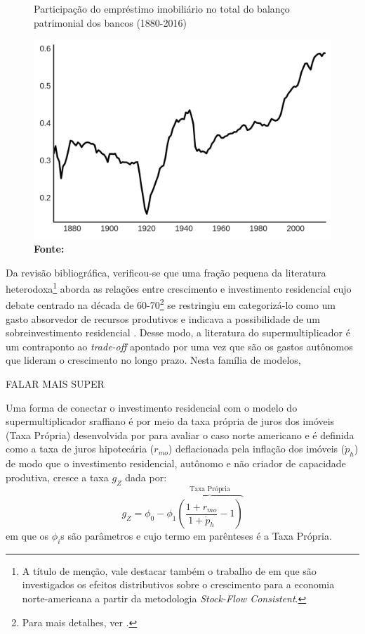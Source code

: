 \begin{figure}
	\centering
	\caption{Participação do empréstimo imobiliário no total do balanço patrimonial dos bancos (1880-2016)}
	\includegraphics{Jorda_Mean.png}
	\caption*{\textbf{Fonte:}}
\end{figure}

Da revisão bibliográfica, verificou-se que uma fração pequena da literatura heterodoxa\footnote{
	A título de menção, vale destacar também o trabalho de \textcite{zezza_u.s._2008} em que são investigados os efeitos distributivos sobre o crescimento para a economia norte-americana a partir da metodologia \textit{Stock-Flow Consistent}.}
aborda as relações entre crescimento e investimento residencial cujo debate centrado na década de 60-70\footnote{Para mais detalhes, ver \textcite{arku_housing_2006}.} se restringiu em categorizá-lo como um gasto absorvedor de recursos produtivos \cite{solow_importance_1995} e indicava  a possibilidade de um sobreinvestimento residencial \cite{mills_has_1987}. Desse modo, a literatura do supermultiplicador é um contraponto ao \textit{trade-off} apontado por \textcite{solow_importance_1995} uma vez que são os gastos autônomos que lideram o crescimento no longo prazo. Nesta família de modelos, 

FALAR MAIS SUPER

Uma forma de conectar o investimento residencial com o modelo do supermultiplicador sraffiano é por meio da taxa própria de juros dos imóveis (Taxa Própria) desenvolvida por \textcite{teixeira_crescimento_2015} para avaliar o caso norte americano e é definida como a taxa de juros hipotecária ($r_{mo}$) deflacionada pela inflação dos imóveis ({$\dot p_h$}) de modo que o investimento residencial, autônomo e não criador de capacidade produtiva, cresce a taxa $g_Z$ dada por:
\begin{equation}
g_Z = \phi_0 - \phi_1 \overbrace{\left(\frac{1+r_{mo}}{1+\dot p_h} - 1\right)}^{\text{Taxa Própria}}
\end{equation}
em que os $\phi_i$s são parâmetros e cujo termo em parênteses é a Taxa Própria. 



